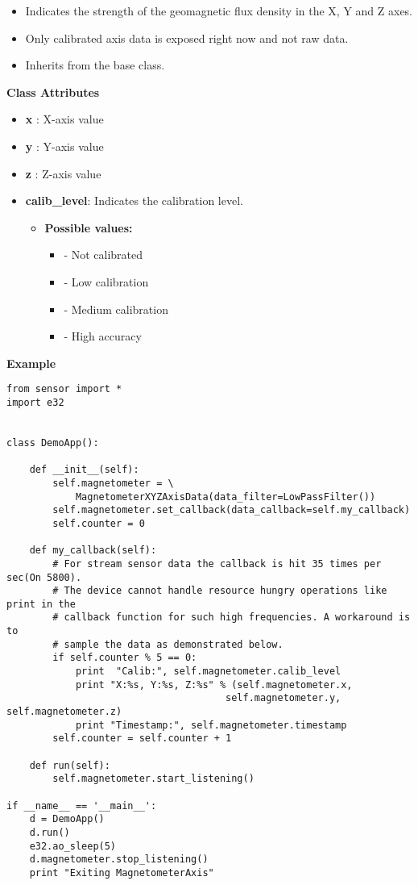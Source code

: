 \begin{itemize}
\item Indicates the strength of the geomagnetic flux density in the X, Y and Z axes.
\item Only calibrated axis data is exposed right now and not raw data.
\item Inherits from the  base class.
\end{itemize}

{\bf Class Attributes} \break

\begin{itemize}
\item {\bf x} : X-axis value
\item {\bf y} : Y-axis value
\item {\bf z} : Z-axis value
\item {\bf calib_level}: Indicates the calibration level.
\begin{itemize}
\item {\bf Possible values:}
\begin{itemize}
\item {} - Not calibrated
\item {} - Low calibration
\item {} - Medium calibration
\item {} - High accuracy
\end{itemize}
\end{itemize}
\end{itemize}

{\bf Example} \break

\begin{verbatim}
from sensor import *
import e32


class DemoApp():

    def __init__(self):
        self.magnetometer = \
            MagnetometerXYZAxisData(data_filter=LowPassFilter())
        self.magnetometer.set_callback(data_callback=self.my_callback)
        self.counter = 0

    def my_callback(self):
        # For stream sensor data the callback is hit 35 times per sec(On 5800).
        # The device cannot handle resource hungry operations like print in the
        # callback function for such high frequencies. A workaround is to
        # sample the data as demonstrated below.
        if self.counter % 5 == 0:
            print  "Calib:", self.magnetometer.calib_level
            print "X:%s, Y:%s, Z:%s" % (self.magnetometer.x,
                                      self.magnetometer.y, self.magnetometer.z)
            print "Timestamp:", self.magnetometer.timestamp
        self.counter = self.counter + 1

    def run(self):
        self.magnetometer.start_listening()

if __name__ == '__main__':
    d = DemoApp()
    d.run()
    e32.ao_sleep(5)
    d.magnetometer.stop_listening()
    print "Exiting MagnetometerAxis"
\end{verbatim}

